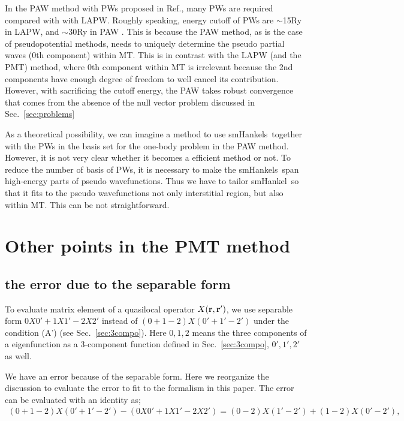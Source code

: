 \documentclass[a4paper,10pt,aip,onecolumn,amsmath,amssymb,floatfix,rmp]{revtex4-1}
\newcommand{\bfr}{{\bf r}}
\newcommand{\refsec}[1]{\mbox{Sec.~\!\ref{#1}}}
\def\smh{smHankel}
\def\smhs{smHankels}
\begin{document}
\begin{widetext}
In the PAW method with PWs proposed in Ref.\cite{kresse99}, many PWs are required
compared with with LAPW. Roughly speaking, energy cutoff of PWs are
$\sim$15Ry in LAPW, and $\sim$30Ry in PAW \cite{filippi94,kresse99}.
This is because the PAW method, as is the case of pseudopotential methods,
needs to uniquely determine the pseudo partial waves (0th component) within MT.
This is in contrast with the LAPW (and the PMT) method, 
where 0th component within MT is irrelevant because 
the 2nd components have enough degree of freedom to well cancel its contribution.
However, with sacrificing the cutoff energy,
the PAW takes robust convergence that comes from the absence of the 
null vector problem discussed in \refsec{sec:problems}

As a theoretical possibility, we can imagine a method to 
use \smhs\ together with the PWs in the basis set
for the one-body problem in the PAW method.
However, it is not very clear whether it becomes 
a efficient method or not. To reduce the number of basis of PWs, it is
necessary to make the \smhs\ span high-energy parts of pseudo
wavefunctions. Thus we have to tailor \smh\ so that it fits to the pseudo
wavefunctions not only interstitial region, but also within MT. 
This can be not straightforward.


\section{Other points in the PMT method}
\subsection{the error due to the separable form}
\label{sec:zeroonetwo}
To evaluate matrix element of a quasilocal operator
$X(\bfr,\bfr')$, we use separable form $0X 0'+1 X 1'-2 X 2'$
instead of $(0+1-2)X(0'+1'-2')$ under the condition (A') 
(see \refsec{sec:3compo}). Here $0,1,2$ means the three components of 
a eigenfunction as a 3-component function defined in
\refsec{sec:3compo}, $0',1',2'$ as well.

We have an error because of the separable form.
Here we reorganize the discussion to evaluate the error
\cite{soler89,PAW} to fit to the formalism in this paper.
The error can be evaluated with an identity as;
\begin{eqnarray}
(0+1-2)X(0'+1'-2')-(0X 0'+1 X 1'-2 X 2') 
= (0-2)X(1'-2')+(1-2)X(0'-2'), \label{eq:zeroonetwo}
\end{eqnarray}
\end{widetext}
\end{document}
